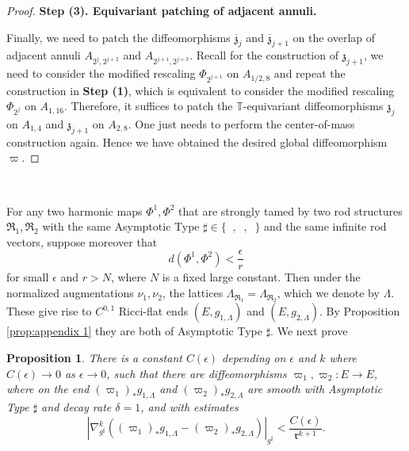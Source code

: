 \documentclass[a4paper,11pt]{amsart}
\newtheorem{proposition}[theorem]{Proposition}
\theoremstyle{definition}
\numberwithin{equation}{section}
\newcommand{\mR} {\mathfrak R}
\DeclareMathOperator{\ALFp}{ALF^+}
\DeclareMathOperator{\ALFm}{ALF^{--}}
\DeclareMathOperator{\AFa}{AF_\beta}
\begin{document}
\begin{proof}
    \vspace{10pt}
    \noindent\textbf{Step (3). Equivariant patching of adjacent annuli.}
    \vspace{10pt}



    Finally, we need to patch the diffeomorphisms $\overline{\mathfrak{z}}_j$ and $\overline{\mathfrak{z}}_{j+1}$ on the overlap of adjacent annuli $A_{2^j,2^{j+2}}$ and $A_{2^{j+1},2^{j+3}}$. Recall for the construction of $\mathfrak{z}_{j+1}$, we need to consider the modified rescaling $\Phi_{2^{j+1}}$ on $A_{1/2,8}$ and repeat the construction in \textbf{Step (1)}, which is equivalent to consider the modified rescaling $\Phi_{2^j}$ on $A_{1,16}$. Therefore, it suffices to patch the $\mathbb{T}$-equivariant diffeomorphisms $\mathfrak{z}_j$ on $A_{1,4}$ and $\mathfrak{z}_{j+1}$ on $A_{2,8}$. One just needs to perform the center-of-mass construction again. Hence we have obtained the desired global diffeomorphism $\varpi$.
\end{proof}

\ 




For any two harmonic maps $\Phi^1,\Phi^2$ that are strongly tamed by two rod structures $\mR_1,\mR_2$ with the same  Asymptotic Type  $\sharp\in\{\ALFm,\ALFp, \AFa\}$ and the same infinite rod vectors,  suppose moreover that 
\begin{equation}\label{eqn:uniform smallness} d(\Phi^1,\Phi^2)<\frac{\epsilon}{r}
\end{equation}
for small $\epsilon$ and $r>N$, where $N$ is a fixed large constant. Then under the normalized augmentations $\nu_1,\nu_2$, the lattices $\Lambda_{\mR_1}=\Lambda_{\mR_2}$, which we denote by $\Lambda$. These give rise to $C^{0,1}$ Ricci-flat ends $(E,g_{1,\Lambda})$ and $(E,g_{2,\Lambda})$. By Proposition \ref{prop:appendix 1} they are both of  Asymptotic Type  $\sharp$. We next prove

\begin{proposition}\label{prop:appendix 2}
    There is a constant $C(\epsilon)$ depending on $\epsilon$ and $k$ where $C(\epsilon)\to0$ as $\epsilon\to0$, such that there are diffeomorphisms $\varpi_1,\varpi_2:E\to E$, where on the end $(\varpi_1)_*g_{1,\Lambda}$ and $(\varpi_2)_*g_{2,\Lambda}$ are smooth with  Asymptotic Type  $\sharp$ and decay rate $\delta=1$, and with estimates 
    $$|\nabla^k_{g^\sharp}((\varpi_1)_*g_{1,\Lambda}-(\varpi_2)_*g_{2,\Lambda})|_{g^\sharp}<\frac{C(\epsilon)}{\mathfrak{r}^{k+1}}.$$
\end{proposition}
\end{document}
